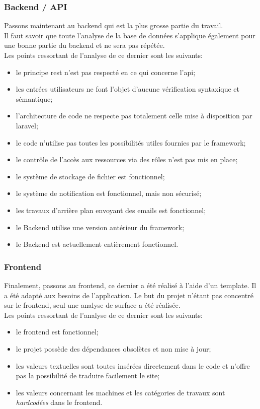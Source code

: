 \documentclass[
    iai, %
    il, %
]{heig-tb}
\begin{document}
\subsubsection{Backend / API}
Passons maintenant au \Gls{backend} qui est la plus grosse partie du travail.\\
Il faut savoir que toute l'analyse de la base de données s'applique également pour une bonne partie du \Gls{backend} et ne sera pas répétée.\\
Les points ressortant de l'analyse de ce dernier sont les suivants:
\begin{itemize}
    \item le principe \Gls{rest} n'est pas respecté en ce qui concerne l'\Gls{api};
    \item les entrées utilisateurs ne font l'objet d'aucune vérification syntaxique et sémantique;
    \item l'architecture de code ne respecte pas totalement celle mise à disposition par \Gls{laravel};
    \item le code n'utilise pas toutes les possibilités utiles fournies par le \Gls{framework};
    \item le contrôle de l'accès aux ressources via des rôles n'est pas mis en place;
    \item le système de stockage de fichier est fonctionnel;
    \item le système de notification est fonctionnel, mais non sécurisé;
    \item les travaux d'arrière plan envoyant des emails est fonctionnel;
    \item le Backend utilise une version antérieur du \Gls{framework};
    \item le Backend est actuellement entièrement fonctionnel.
\end{itemize}

\subsubsection{Frontend}
Finalement, passons au \Gls{frontend}, ce dernier a été réalisé à l'aide d'un \Gls{template}. Il a été adapté aux besoins de l'application. Le but du projet n'étant pas concentré sur le \Gls{frontend}, seul une analyse de surface a été réalisée.\\
Les points ressortant de l'analyse de ce dernier sont les suivants:
\begin{itemize}
    \item le \Gls{frontend} est fonctionnel;
    \item le projet possède des dépendances obsolètes et non mise à jour;
    \item les valeurs textuelles sont toutes insérées directement dans le code et n'offre pas la possibilité de traduire facilement le site;
    \item les valeurs concernant les machines et les catégories de travaux sont \emph{hardcodées} dans le \Gls{frontend}.
\end{itemize}
\end{document}
